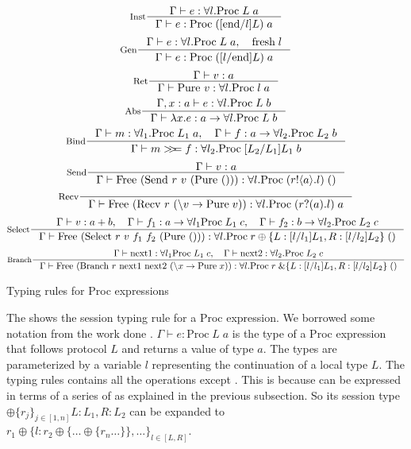 \begin{table}[ht]
    \[
        \inference[Inst]{\Gamma \vdash e : \forall l. \text{Proc} \; L \; a}{\Gamma \vdash e : \text{Proc} \; ([\text{end}/l]L) \; a}
    \]
    \[
        \inference[Gen]{\Gamma \vdash e : \forall l. \text{Proc} \; L \; a, \quad \text{fresh} \; l}{\Gamma \vdash e : \text{Proc} \; ([l/\text{end}]L) \; a}
    \]
    \[
        \inference[Ret]{\Gamma |- v : a}{\Gamma |- \text{Pure $v$} : \forall l. \text{Proc} \; l \; a}
    \]
    \[
        \inference[Abs]{\Gamma, x : a |- e : \forall l. \text{Proc} \; L \; b}{\Gamma |- \lambda x. e : a \rightarrow \forall l. \text{Proc} \; L \; b}
    \]
    \[\inference[Bind]{\Gamma |- m : \forall l_1. \Mp{L_1}{a}, \quad \Gamma |- f : a \rightarrow \forall l_2. \Mp{L_2}{b}}{\Gamma |- m >\!\!>\!\!= f : \forall l_2. \Mp{[L_2/L_1]L_1}{b}}\]
    \[\inference[Send]{\Gamma |- v : a}{\Gamma |- \text{Free (Send $r$ $v$ (Pure $()$))} : \forall l. \Mp{(r!\langle a \rangle.l)}{()}}\]
    \[\inference[Recv]{}{\Gamma |- \text{Free (Recv $r$ $(\backslash v -> \text{Pure} \; v)$)} : \forall l. \Mp{(r?(a).l)}{a}}\]
    \[\inference[Select]{\Gamma |- v : a + b, \quad \Gamma |- f_1 : a \rightarrow \forall l_1 \Mp{L_1}{c}, \quad \Gamma |- f_2 : b \rightarrow \forall l_2. \Mp{L_2}{c}}{\Gamma |- \text{Free (Select $r$ $v$ $f_1$ $f_2$ (Pure $()$))} : \forall l. \Mp{r \oplus \{ L : [l/l_1]L_1, R: [l/l_2]L_2\}}{()}}\]
    \[\inference[Branch]{\Gamma |- \text{next1} : \forall l_1 \Mp{L_1}{c}, \quad \Gamma |- \text{next2} : \forall l_2. \Mp{L_2}{c}}{\Gamma |- \text{Free (Branch $r$ next1 next2 ($\backslash x \rightarrow \text{Pure}\; x$))} : \forall l. \Mp{r \; \& \{ L : [l/l_1]L_1, R: [l/l_2]L_2\}}{()}}\]
    \caption{Typing rules for Proc expressions}
    \label{spar:styperule}
\end{table}

The  shows the session typing rule for a Proc expression. We borrowed some notation from the work done \cite{AlgebraicMultipartyProtocol}. $\Gamma \vdash e : \text{Proc} \; L \; a$ is the type of a Proc expression that follows protocol $L$ and returns a value of type $a$. The types are parameterized by a variable $l$ representing the continuation of a local type $L$. The typing rules contains all the operations except . This is because  can be expressed in terms of a series of  as explained in the previous subsection. So its session type $\oplus \{r_j\}_{j \in [1,n]} {L:L_1, R: L_2}$ can be expanded to $r_1 \oplus \{l: r_2 \oplus \{\ldots \oplus\{r_n \ldots\}\},\ldots\}_{l \in [L, R]}$. 

